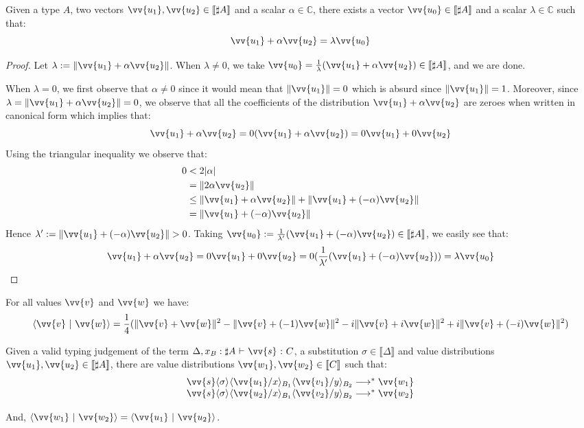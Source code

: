 \documentclass[runningheads,orivec,envcountsame,envcountsect]{llncs}
\newcommand\lra{\longrightarrow}
\newcommand\ansubst[2]{\ensuremath{\langle #1 \rangle_{#2}}}
\def\C{\mathbb{C}}            %
\def\scal#1#2{\langle{#1}~|~{#2}\rangle}
\def\eval{\lra^*}
\def\sem#1{\llbracket#1\rrbracket}
\def\TYP#1#2#3{#1~{\vdash}~#2~{:}~#3}
\begin{document}
\begin{lemma}\label{lem:VecRewrite}%
Given a type $A$, two vectors $\vv{u_1},\vv{u_2}\in\sem{\sharp A}$ and a scalar $\alpha\in\C$, there exists a vector $\vv{u_0}\in\sem{\sharp A}$ and a scalar $\lambda\in\C$ such that:
\[
\vv{u_1} + \alpha\vv{u_2} = \lambda \vv{u_0} 
\]
\end{lemma}
\begin{proof}
    Let $\lambda:=\|\vv{u_1}+\alpha\vv{u_2}\|$. When $\lambda\neq 0$, we take $\vv{u_0}=\frac{1}{\lambda}(\vv{u_1}+\alpha\vv{u_2})\in\sem{\sharp A}$, and we are done.

    When $\lambda=0$, we first observe that $\alpha\neq 0$ since it would mean that $\|\vv{u_1}\|=0$ which is absurd since $\|\vv{u_1}\|=1$. Moreover, since $\lambda=\|\vv{u_1}+\alpha\vv{u_2}\|=0$, we observe that all the coefficients of the distribution $\vv{u_1}+\alpha\vv{u_2}$ are zeroes when written in canonical form which implies that:
    \[
    \vv{u_1}+\alpha\vv{u_2} = 0(\vv{u_1}+\alpha\vv{u_2}) = 0\vv{u_1}+0\vv{u_2}
    \]
    Using the triangular inequality we observe that:
    \begin{align*}
    0 &< 2|\alpha|\\
    &= \|2\alpha\vv{u_2}\|\\
    &\leq\|\vv{u_1}+\alpha\vv{u_2}\| + \|\vv{u_1 }+ (-\alpha)\vv{u_2}\|\\
    &= \|\vv{u_1}+(-\alpha)\vv{u_2}\|
    \end{align*}
    Hence $\lambda' := \|\vv{u_1}+(-\alpha)\vv{u_2}\|>0$. Taking $\vv{u_0}:= \frac{1}{\lambda'}(\vv{u_1}+ (-\alpha)\vv{u_2})\in\sem{\sharp A}$, we easily see that:
    \[
    \vv{u_1}+\alpha\vv{u_2} = 0\vv{u_1} + 0\vv{u_2} = 0(\frac{1}{\lambda'} (\vv{u_1} + (-\alpha) \vv{u_2})) = \lambda \vv{u_0}
    \]
\end{proof}

\begin{theorem}\label{prop:Polarization} %
For all values $\vv{v}$ and $\vv{w}$ we have:
\[
  \scal{\vv{v}}{\vv{w}}=
  \frac{1}{4} (\|\vv{v}+\vv{w}\|^2 - \|\vv{v} + (-1) \vv{w}\|^2 - i\|\vv{v} + i\vv{w}\|^2 + i\|\vv{v}+ (-i)\vv{w}\|^2)
\]
\end{theorem}

\begin{lemma}\label{lem:InnerProdSingleVar} %
Given a valid typing judgement of the term $\TYP{\Delta,x_B:\sharp A}{\vv{s}}{C}$, a substitution $\sigma\in\sem{\Delta}$ and value distributions $\vv{u_1},\vv{u_2}\in\sem{\sharp A}$, there are value distributions $\vv{w_1}, \vv{w_2}\in\sem{C}$ such that:
\[
\begin{array}{c}
    \vv{s}\ansubst{\sigma}{}\ansubst{\vv{u_1}/x}{B_1}{\ansubst{\vv{v_1}/y}{B_2}}\eval\vv{w_1}\\
    \vv{s}\ansubst{\sigma}{}\ansubst{\vv{u_2}/x}{B_1}{\ansubst{\vv{v_2}/y}{B_2}}\eval\vv{w_2}\\
\end{array}
\]

And, $\scal{\vv{w_1}}{\vv{w_2}} = \scal{\vv{u_1}}{\vv{u_2}}$.
\end{lemma}
\end{document}
